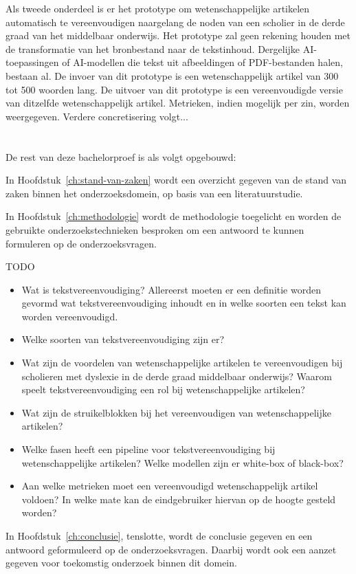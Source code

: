 Als tweede onderdeel is er het prototype om wetenschappelijke artikelen automatisch te vereenvoudigen naargelang de noden van een scholier in de derde graad van het middelbaar onderwijs. Het prototype zal geen rekening houden met de transformatie van het bronbestand naar de tekstinhoud. Dergelijke AI-toepassingen of AI-modellen die tekst uit afbeeldingen of PDF-bestanden halen, bestaan al. De invoer van dit prototype is een wetenschappelijk artikel van 300 tot 500 woorden lang. De uitvoer van dit prototype is een vereenvoudigde versie van ditzelfde wetenschappelijk artikel. Metrieken, indien mogelijk per zin, worden weergegeven. Verdere concretisering volgt...

\section{}%
\label{sec:opzet-bachelorproef}


De rest van deze bachelorproef is als volgt opgebouwd:

In Hoofdstuk~\ref{ch:stand-van-zaken} wordt een overzicht gegeven van de stand van zaken binnen het onderzoeksdomein, op basis van een literatuurstudie.

In Hoofdstuk~\ref{ch:methodologie} wordt de methodologie toegelicht en worden de gebruikte onderzoekstechnieken besproken om een antwoord te kunnen formuleren op de onderzoeksvragen.


TODO
\begin{itemize}
	\item Wat is tekstvereenvoudiging? Allereerst moeten er een definitie worden gevormd wat tekstvereenvoudiging inhoudt en in welke soorten een tekst kan worden vereenvoudigd. 
	\item Welke soorten van tekstvereenvoudiging zijn er?
	\item Wat zijn de voordelen van wetenschappelijke artikelen te vereenvoudigen bij scholieren met dyslexie in de derde graad middelbaar onderwijs? Waarom speelt tekstvereenvoudiging een rol bij wetenschappelijke artikelen?
	\item Wat zijn de struikelblokken bij het vereenvoudigen van wetenschappelijke artikelen?
	\item Welke fasen heeft een pipeline voor tekstvereenvoudiging bij wetenschappelijke artikelen? Welke modellen zijn er white-box of black-box?
	\item Aan welke metrieken moet een vereenvoudigd wetenschappelijk artikel voldoen? In welke mate kan de eindgebruiker hiervan op de hoogte gesteld worden? 
\end{itemize}

In Hoofdstuk~\ref{ch:conclusie}, tenslotte, wordt de conclusie gegeven en een antwoord geformuleerd op de onderzoeksvragen. Daarbij wordt ook een aanzet gegeven voor toekomstig onderzoek binnen dit domein.